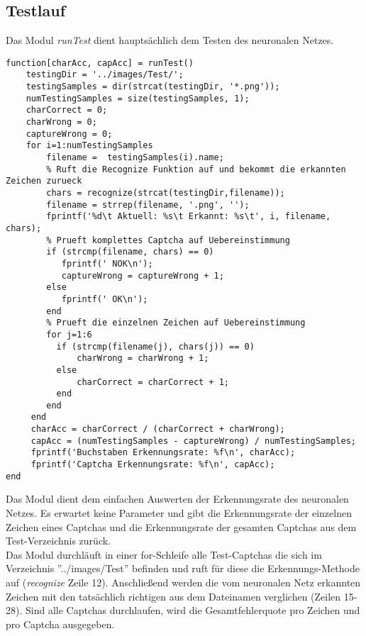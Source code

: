 \subsection{Testlauf}
Das Modul \textit{runTest} dient hauptsächlich dem Testen des neuronalen Netzes. 
\begin{lstlisting}
function[charAcc, capAcc] = runTest()
    testingDir = '../images/Test/';    
    testingSamples = dir(strcat(testingDir, '*.png'));
    numTestingSamples = size(testingSamples, 1);
    charCorrect = 0;
    charWrong = 0;
    captureWrong = 0;
    for i=1:numTestingSamples
        filename =  testingSamples(i).name;
        % Ruft die Recognize Funktion auf und bekommt die erkannten Zeichen zurueck
        chars = recognize(strcat(testingDir,filename));
        filename = strrep(filename, '.png', '');
        fprintf('%d\t Aktuell: %s\t Erkannt: %s\t', i, filename, chars);
        % Prueft komplettes Captcha auf Uebereinstimmung
        if (strcmp(filename, chars) == 0)
           fprintf(' NOK\n');
           captureWrong = captureWrong + 1;
        else
           fprintf(' OK\n');
        end
        % Prueft die einzelnen Zeichen auf Uebereinstimmung
        for j=1:6
          if (strcmp(filename(j), chars(j)) == 0) 
              charWrong = charWrong + 1;
          else
              charCorrect = charCorrect + 1;
          end
        end   
     end
     charAcc = charCorrect / (charCorrect + charWrong);
     capAcc = (numTestingSamples - captureWrong) / numTestingSamples;
     fprintf('Buchstaben Erkennungsrate: %f\n', charAcc);
     fprintf('Captcha Erkennungsrate: %f\n', capAcc);
end
\end{lstlisting}
Das Modul dient dem einfachen Auswerten der Erkennungsrate des neuronalen Netzes. Es erwartet keine Parameter und gibt die Erkennungsrate der einzelnen Zeichen eines Captchas und die Erkennungsrate der gesamten Captchas aus dem Test-Verzeichnis zurück.\\
Das Modul durchläuft in einer for-Schleife alle Test-Captchas die sich im Verzeichnis ''../images/Test'' befinden und ruft für diese die Erkennungs-Methode auf (\textit{recognize} Zeile 12). Anschließend werden die vom neuronalen Netz erkannten Zeichen mit den tatsächlich richtigen aus dem Dateinamen verglichen (Zeilen 15-28). Sind alle Captchas durchlaufen, wird die Gesamtfehlerquote pro Zeichen und pro Captcha ausgegeben.
